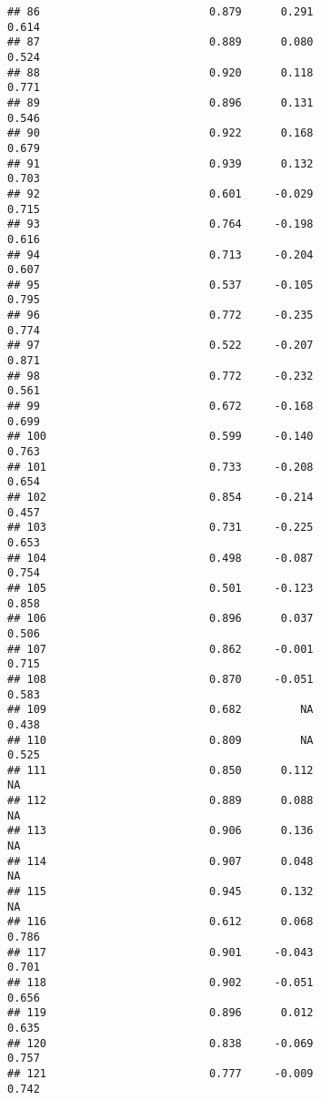 \documentclass[
]{article}
\begin{document}
\begin{verbatim}
## 86                          0.879      0.291                     0.614
## 87                          0.889      0.080                     0.524
## 88                          0.920      0.118                     0.771
## 89                          0.896      0.131                     0.546
## 90                          0.922      0.168                     0.679
## 91                          0.939      0.132                     0.703
## 92                          0.601     -0.029                     0.715
## 93                          0.764     -0.198                     0.616
## 94                          0.713     -0.204                     0.607
## 95                          0.537     -0.105                     0.795
## 96                          0.772     -0.235                     0.774
## 97                          0.522     -0.207                     0.871
## 98                          0.772     -0.232                     0.561
## 99                          0.672     -0.168                     0.699
## 100                         0.599     -0.140                     0.763
## 101                         0.733     -0.208                     0.654
## 102                         0.854     -0.214                     0.457
## 103                         0.731     -0.225                     0.653
## 104                         0.498     -0.087                     0.754
## 105                         0.501     -0.123                     0.858
## 106                         0.896      0.037                     0.506
## 107                         0.862     -0.001                     0.715
## 108                         0.870     -0.051                     0.583
## 109                         0.682         NA                     0.438
## 110                         0.809         NA                     0.525
## 111                         0.850      0.112                        NA
## 112                         0.889      0.088                        NA
## 113                         0.906      0.136                        NA
## 114                         0.907      0.048                        NA
## 115                         0.945      0.132                        NA
## 116                         0.612      0.068                     0.786
## 117                         0.901     -0.043                     0.701
## 118                         0.902     -0.051                     0.656
## 119                         0.896      0.012                     0.635
## 120                         0.838     -0.069                     0.757
## 121                         0.777     -0.009                     0.742

\end{verbatim}
\end{document}
